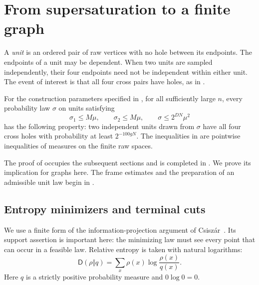 \section{From supersaturation to a finite graph}\label{sec:distributions}

A \emph{unit} is an ordered pair of raw vertices with no hole between its endpoints.
The endpoints of a unit may be dependent.
When two units are sampled independently, their four endpoints need not be independent within either unit.
The event of interest is that all four cross pairs have holes, as in .

\begin{theorem}\label{thm:raw-supersaturation}
For the construction parameters specified in , for all sufficiently large \(n\), every probability law \(\sigma\) on units satisfying
\begin{equation}\label{eq:raw-law-caps}
 \sigma_1\le M\mu,\qquad \sigma_2\le M\mu,\qquad
 \sigma\le 2^{DN}\mu^2
\end{equation}
has the following property: two independent units drawn from \(\sigma\) have all four cross holes with probability at least \(2^{-100gN}\).
The inequalities in  are pointwise inequalities of measures on the finite raw spaces.
\end{theorem}

The proof of  occupies the subsequent sections and is completed in .
We prove its implication for graphs here. The frame estimates and the preparation of an admissible unit law begin in .

\subsection{Entropy minimizers and terminal cuts}

We use a finite form of the information-projection argument of
Csisz\'ar~\citep{csiszar1975}. Its support assertion is important here:
the minimizing law must see every point that can occur in a feasible law.
Relative entropy is taken with natural logarithms:
\[
 \mathsf D(\rho\Vert q)=\sum_x\rho(x)\log\frac{\rho(x)}{q(x)}.
\]
Here \(q\) is a strictly positive probability measure and \(0\log0=0\).

